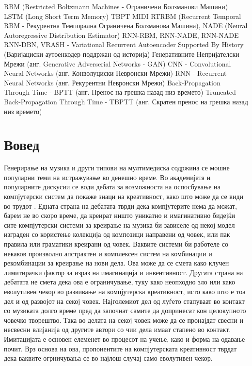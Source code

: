 RBM (Restricted Boltzmann Machines - Ограничени Болзманови Машини)
LSTM (Long Short Term Memory)
TBPT 
MIDI
RTRBM (Recurrent Temporal RBM - Рекурентна Темпорална Ограничена Болзманова Машина), 
NADE (Neural Autoregressive Distribution Estimator)
RNN-RBM, 
RNN-NADE, 
RNN-NADE
RNN-DBN,
VRASH - Variational Recurrent Autoencoder Supported By History (Варијациски аутоенкодер поддржан од историја)
Генеративните Непријателски Мрежи (анг. Generative Adverserial Networks - GAN)
CNN - Convolutional Neural Networks (анг. Конволуциски Невронски Мрежи)
RNN - Recurrent Neural Networks (анг. Рекурентни Невронски Мрежи)
Back-Propagation Through Time - BPTT (анг. Пренос на грешка назад низ времето)
Truncated Back-Propagation Through Time - TBPTT (анг. Скратен пренос на грешка назад низ времето)
\chapter{Вовед}

Генерирање на музика и други типови на мултимедиска содржина се мошне популарни теми на истражување во денешно време. Во академијата и популарните дискусии се води дебата за возможноста на оспосбување на компјутерски систем да покаже знаци на креативност, како што може да се види во трудот \cite{Ghedini2015}. Едната страна на дебатата тврди дека компјутерите нема да можат, барем не во скоро време, да креират ништо уникатно и имагинативно бидејќи сите компјутерски системи за креирање на музика би зависеле од некој модел изграден со користење колекција од композици направени од човек, или пак правила или граматики креирани од човек. Ваквите системи би работеле со некаков произволно апстрактен и комплексен систем на комбинации и рекомбинации за креирање на нови дела. Ова може да се смета како клучен лимитирачки фактор за израз на имагинација и инвентивност. Другата страна на дебатата не смета дека ова е ограничување, туку како неопходно зло или како еволутивен чекор во развивање на компјутерска креативност, исто како што е тоа дел и од развојот на секој човек. Најголемиот дел од луѓето стапуваат во контакт со музиката долго време пред да започнат самите да допринесат кон целокупното човечко творештво. Така во делата на секој човек може да се пронајдат свесни и несвесни влијанија од другите автори со чии дела имаат стапено во контакт. Имитацијата е основен елеменет во процесот на учење, како и форма на одавање почит. Врз основа на ова, пропонентите на компјутерската креативност тврдат дека ваквите огрничувања се во најлош случај само еволутивен чекор.

